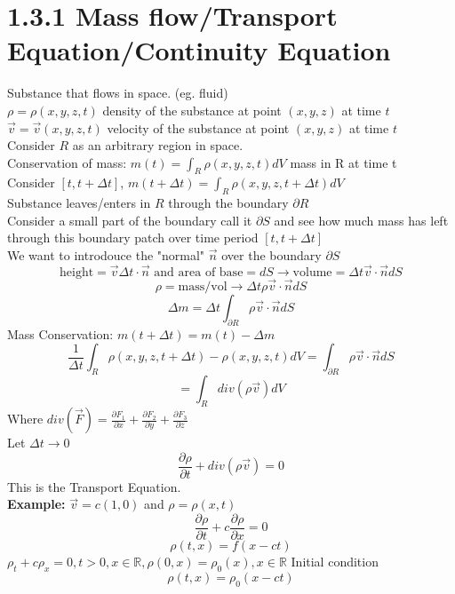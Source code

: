 \documentclass{article}
\newcommand{\partialfrac}[2]{\frac{\partial #1}{\partial #2}}
\begin{document}
\section*{1.3.1 Mass flow/Transport Equation/Continuity Equation}
Substance that flows in space. (eg. fluid)\\
$\rho = \rho(x,y,z,t)$ density of the substance at point $(x,y,z)$ at time $t$\\
$\vec{v} = \vec{v}(x,y,z,t)$ velocity of the substance at point $(x,y,z)$ at time $t$\\
Consider $R$ as an arbitrary region in space.\\
Conservation of mass: $m(t) = \int_{R} \rho(x,y,z,t)dV$ mass in R at time t\\
Consider $[t , t + \Delta t]$, $m(t+\Delta t) = \int_{R} \rho(x,y,z,t+\Delta t)dV$\\
Substance leaves/enters in $R$ through the boundary $\partial R$\\
Consider a small part of the boundary call it $\partial S$ and see how much mass has left through this boundary patch over time period $[t,t+\Delta t]$\\
We want to introdouce the "normal" $\vec{n}$ over the boundary $\partial S$\\
$$\text{height} = \vec{v} \Delta t \cdot \vec{n} \text{ and area of base} = dS \rightarrow \text{volume} = \Delta t \vec{v} \cdot \vec{n} dS $$
$$\rho = \text{mass/vol} \rightarrow \Delta t \rho \vec{v} \cdot \vec{n} dS$$
$$ \Delta m = \Delta t \int_{\partial R} \rho \vec{v} \cdot \vec{n} dS$$
Mass Conservation: $m(t + \Delta t) = m(t) - \Delta m $\\
$$\frac{1}{\Delta t} \int_{R} \rho(x,y,z,t+\Delta t) - \rho(x,y,z,t)dV =\int_{\partial R} \rho \vec{v} \cdot \vec{n} dS$$
$$ = \int_{R} div(\rho \vec{v})dV$$
Where $div(\vec{F}) = \partialfrac{F_1}{x} + \partialfrac{F_2}{y} + \partialfrac{F_3}{z}$\\
Let $\Delta t \rightarrow 0$\\
$$\partialfrac{\rho}{t} + div(\rho \vec{v}) = 0$$
This is the Transport Equation.\\
\textbf{Example:} $\vec{v} = c(1,0)$ and $\rho = \rho(x,t)$\\
$$\partialfrac{\rho}{t} + c\partialfrac{\rho}{x} = 0$$
$$\rho(t,x) = f(x-ct)$$
$\rho_t + c\rho_x = 0, t>0, x \in \mathds{R}, \rho(0,x) = \rho_0(x), x \in \mathds{R}$ Initial condition\\
$$\rho(t,x) = \rho_0(x-ct)$$ 
\end{document}
